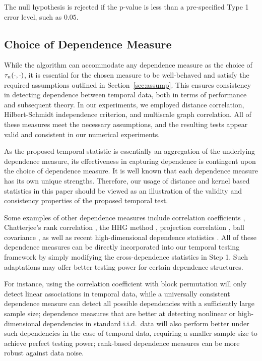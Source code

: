 The null hypothesis is rejected if the p-value is less than a pre-specified Type 1 error level, such as $0.05$.
    
\subsection{Choice of Dependence Measure}

While the algorithm can accommodate any dependence measure as the choice of $\tau_{n}(\cdot,\cdot)$, it is essential for the chosen measure to be well-behaved and satisfy the required assumptions outlined in Section~\ref{sec:assump}. This ensures consistency in detecting dependence between temporal data, both in terms of performance and subsequent theory. In our experiments, we employed distance correlation, Hilbert-Schmidt independence criterion, and multiscale graph correlation. All of these measures meet the necessary assumptions, and the resulting tests appear valid and consistent in our numerical experiments.

As the proposed temporal statistic is essentially an aggregation of the underlying dependence measure, its effectiveness in capturing dependence is contingent upon the choice of dependence measure. It is well known that each dependence measure has its own unique strengths. Therefore, our usage of distance and kernel based statistics in this paper should be viewed as an illustration of the validity and consistency properties of the proposed temporal test. 

Some examples of other dependence measures include correlation coefficients \cite{Fukumizu2007,Bießmann2010}, Chatterjee’s rank correlation \cite{Chatterjee2021, shi2021, shi2022}, the HHG method \cite{HellerGorfine2013,heller2016consistent}, projection correlation \cite{Zhu2017}, ball covariance \cite{Pan2020}, as well as recent high-dimensional dependence statistics \cite{Shao2019, Huo2022, DcorHD, Xu2024, Zhou2024}. All of these dependence measures can be directly incorporated into our temporal testing framework by simply modifying the cross-dependence statistics in Step 1. Such adaptations may offer better testing power for certain dependence structures.

For instance, using the correlation coefficient with block permutation will only detect linear associations in temporal data, while a universally consistent dependence measure can detect all possible dependencies with a sufficiently large sample size; dependence measures that are better at detecting nonlinear or high-dimensional dependencies in standard i.i.d.~data will also perform better under such dependencies in the case of temporal data, requiring a smaller sample size to achieve perfect testing power; rank-based dependence measures can be more robust against data noise. 

